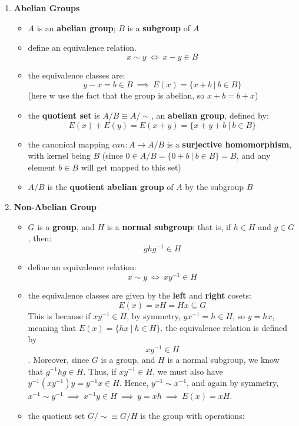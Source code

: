\documentclass{exam}
\begin{document}
\begin{enumerate}
    \item \textbf{Abelian Groups}
    \begin{itemize}
        \item $A$ is an \textbf{abelian group}; $B$ is a \textbf{subgroup} of $A$
        \item define an equivalence relation.
        \[
        x \sim y \ \iff \ x - y \in B
        \]
        \item the equivalence classes are:
        \[
        y - x = b \in B \ \implies \ E(x) = \{x + b \ | \ b \in B\}
        \]
        (here w use the fact that the group is abelian, so $x + b = b+x$)
        \item the \textbf{quotient set} is $A/B \equiv A/\sim$, an \textbf{abelian group}, defined by:
        \[
        E(x) + E(y) = E(x + y) = \{x + y + b \ | \ b \in B\}
        \]
        \item the canonical mapping $can : A \to A/B$ is a \textbf{surjective homomorphism}, with kernel being $B$ (since $0 \in A/B = \{0 + b \ | \ b \in B\} = B$, and any element $b \in B$ will get mapped to this set)
        \item $A / B$ is the \textbf{quotient abelian group} of $A$ by the subgroup $B$
    \end{itemize}
    \item \textbf{Non-Abelian Group}
    \begin{itemize}
        \item $G$ is a \textbf{group}, and $H$ is a \textbf{normal subgroup}: that is, if $h \in H$ and $g \in G$, then:
        \[
        ghg^{-1} \in H
        \]
        \item define an equivalence relation:
        \[
        x \sim y \ \iff \ xy^{-1} \in H
        \]
        \item the equivalence classes are given by the \textbf{left} and \textbf{right} cosets:
        \[
        E(x) = xH = Hx \subseteq G
        \]
        This is because if $xy^{-1} \in H$, by symmetry, $yx^{-1} = h \in H$, so $y = hx$, meaning that $E(x) = \{hx \ | \ h \in H\}$. the equivalence relation is defined by $$xy^{-1} \in H$$. Moreover, since $G$ is a group, and $H$ is a normal subgroup, we know that $g^{-1}hg \in H$. Thus, if $xy^{-1} \in H$, we must also have $y^{-1}(xy^{-1})y = y^{-1}x \in H$. Hence, $y^{-1} \sim x^{-1}$, and again by symmetry, $x^{-1} \sim y^{-1} \ \implies \ x^{-1}y \in H \ \implies \ y = xh \ \implies \ E(x) = xH$.
        \item the quotient set $G / \sim \equiv G / H$ is the group with operations:

\end{itemize}
\end{enumerate}
\end{document}
